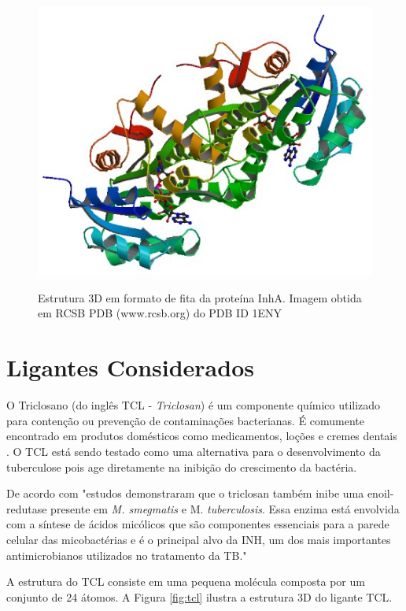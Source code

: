 \begin{figure}[h]
	\center
	\includegraphics[width=14cm]{images/inha.png}
	\label{fig:inha}
	\caption{Estrutura 3D em formato de fita da proteína InhA. Imagem obtida em RCSB PDB (www.rcsb.org) do PDB ID 1ENY}
\end{figure}

\section{Ligantes Considerados}

O Triclosano (do inglês TCL - \emph{Triclosan}) é um componente químico utilizado para contenção ou prevenção de contaminações bacterianas. É comumente encontrado em produtos domésticos como medicamentos, loções e cremes dentais \cite{TCL}. O TCL está sendo testado como uma alternativa para o desenvolvimento da tuberculose pois age diretamente na inibição do crescimento da bactéria.

De acordo com \cite{GAU08} "estudos demonstraram que o triclosan também inibe uma enoil-redutase presente em \emph{M. smegmatis} e M. \emph{tuberculosis}. Essa enzima está envolvida com a síntese de ácidos micólicos que são componentes essenciais para a parede celular das  micobactérias e é o principal alvo da INH, um dos mais importantes antimicrobianos utilizados no tratamento da TB."

A estrutura do TCL consiste em uma pequena molécula composta por um conjunto de 24 átomos. A Figura \ref{fig:tcl} ilustra a estrutura 3D do ligante TCL.

